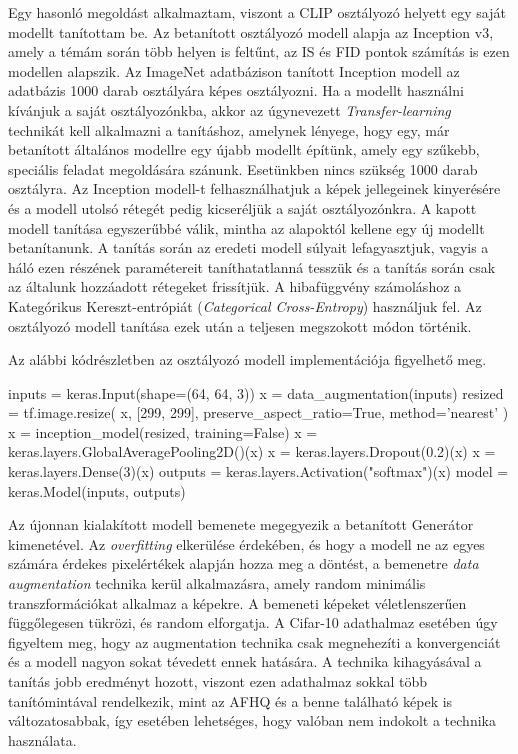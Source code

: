 Egy hasonló megoldást alkalmaztam, viszont a CLIP osztályozó helyett egy saját modellt tanítottam be. Az betanított osztályozó modell alapja az Inception v3, amely a témám során több helyen is feltűnt, az IS és FID pontok számítás is ezen modellen alapszik. Az ImageNet \cite{deng2009imagenet} adatbázison tanított Inception modell az adatbázis 1000 darab osztályára képes osztályozni. Ha a modellt használni kívánjuk a saját osztályozónkba, akkor az úgynevezett \textit{Transfer-learning} \cite{tensorflow} technikát kell alkalmazni a tanításhoz, amelynek lényege, hogy egy, már betanított általános modellre egy újabb modellt építünk, amely egy szűkebb, speciális feladat megoldására szánunk. Esetünkben nincs szükség 1000 darab osztályra. Az Inception modell-t felhasználhatjuk a képek jellegeinek kinyerésére és a modell utolsó rétegét pedig kicseréljük a saját osztályozónkra. A kapott modell tanítása egyszerűbbé válik, mintha az alapoktól kellene egy új modellt betanítanunk.
A tanítás során az eredeti modell súlyait lefagyasztjuk, vagyis a háló ezen részének paramétereit taníthatatlanná tesszük és a tanítás során csak az általunk hozzáadott rétegeket frissítjük.
A hibafüggvény számoláshoz a Kategórikus Kereszt-entrópiát (\textit{Categorical Cross-Entropy}) használjuk fel. Az osztályozó modell tanítása ezek után a teljesen megszokott módon történik.

Az alábbi kódrészletben az osztályozó modell implementációja figyelhető meg.

\begin{python}
inputs = keras.Input(shape=(64, 64, 3))
x = data_augmentation(inputs)
resized = tf.image.resize(
    x, [299, 299],
    preserve_aspect_ratio=True, method='nearest'
)
x = inception_model(resized, training=False)
x = keras.layers.GlobalAveragePooling2D()(x)
x = keras.layers.Dropout(0.2)(x)
x = keras.layers.Dense(3)(x)
outputs = keras.layers.Activation("softmax")(x)
model = keras.Model(inputs, outputs)
\end{python}

Az újonnan kialakított modell bemenete megegyezik a betanított Generátor kimenetével. Az \textit{overfitting} elkerülése érdekében, és hogy a modell ne az egyes számára érdekes pixelértékek alapján hozza meg a döntést, a bemenetre \textit{data augmentation} technika kerül alkalmazásra, amely random minimális transzformációkat alkalmaz a képekre. A bemeneti képeket véletlenszerűen függőlegesen tükrözi, és random elforgatja. A Cifar-10 adathalmaz esetében úgy figyeltem meg, hogy az augmentation technika csak megnehezíti a konvergenciát és a modell nagyon sokat tévedett ennek hatására. A technika kihagyásával a tanítás jobb eredményt hozott, viszont ezen adathalmaz sokkal több tanítómintával rendelkezik, mint az AFHQ és a benne található képek is változatosabbak, így esetében lehetséges, hogy valóban nem indokolt a technika használata.

